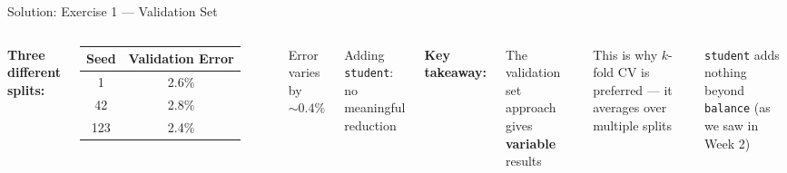 \documentclass[aspectratio=169, 11pt]{beamer}
\begin{document}
\begin{frame}{Solution: Exercise 1 --- Validation Set}
\begin{columns}
\textbf{Three different splits:}

\begin{tabular}{cc}
\toprule
Seed & Validation Error \\
\midrule
1 & 2.6\% \\
42 & 2.8\% \\
123 & 2.4\% \\
\bottomrule
\end{tabular}

\vspace{0.3em}
Error varies by $\sim 0.4\%$

\vspace{0.3em}
Adding \texttt{student}: no meaningful reduction

\textbf{Key takeaway:}

The validation set approach gives \textbf{variable} results

\vspace{0.3em}
This is why $k$-fold CV is preferred --- it averages over multiple splits

\vspace{0.3em}
\texttt{student} adds nothing beyond \texttt{balance} (as we saw in Week 2)
\end{columns}
\end{frame}
\end{document}
